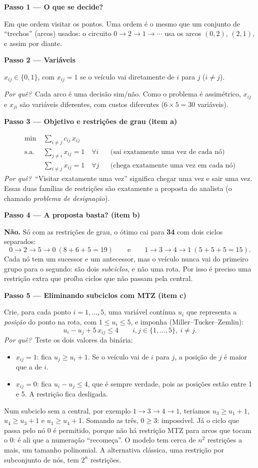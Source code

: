 \documentclass[11pt,a4paper]{article}
\newcommand{\passo}[1]{\par\medskip\textbf{#1}\par}
\newcommand{\porque}{\textit{Por quê?}\ }
\begin{document}
\passo{Passo 1 --- O que se decide?}
Em que ordem visitar os pontos. Uma ordem é o mesmo que um conjunto de ``trechos'' (arcos) usados: o
circuito $0\to2\to1\to\cdots$ usa os arcos $(0,2)$, $(2,1)$, e assim por diante.

\passo{Passo 2 --- Variáveis}
$x_{ij}\in\{0,1\}$, com $x_{ij}=1$ se o veículo vai diretamente de $i$ para $j$ ($i\ne j$).

\porque Cada arco é uma decisão sim/não. Como o problema é assimétrico, $x_{ij}$ e $x_{ji}$ são variáveis
diferentes, com custos diferentes ($6\times5=30$ variáveis).

\passo{Passo 3 --- Objetivo e restrições de grau (item a)}
\begin{align*}
  \min\ & \sum_{i\ne j} c_{ij}\,x_{ij}\\
  \text{s.a.}\ & \sum_{j\ne i} x_{ij} = 1 \quad \forall i && \text{(sai exatamente uma vez de cada nó)}\\
  & \sum_{i\ne j} x_{ij} = 1 \quad \forall j && \text{(chega exatamente uma vez em cada nó)}
\end{align*}
\porque ``Visitar exatamente uma vez'' significa chegar uma vez e sair uma vez. Essas duas famílias de
restrições são exatamente a proposta do analista (o chamado \emph{problema de designação}).

\passo{Passo 4 --- A proposta basta? (item b)}
\textbf{Não.} Só com as restrições de grau, o ótimo cai para \textbf{34} com dois ciclos separados:
\[
  0\to2\to5\to0 \ (8+6+5=19) \qquad\text{e}\qquad 1\to3\to4\to1 \ (5+5+5=15).
\]
Cada nó tem um sucessor e um antecessor, mas o veículo nunca vai do primeiro grupo para o segundo: são dois
\emph{subciclos}, e não uma rota. Por isso é preciso uma restrição extra que proíba ciclos que não passam pela central.

\passo{Passo 5 --- Eliminando subciclos com MTZ (item c)}
Crie, para cada ponto $i=1,\dots,5$, uma variável contínua $u_i$ que representa a \emph{posição} do ponto na
rota, com $1\le u_i\le5$, e imponha (Miller--Tucker--Zemlin):
\[
  u_i - u_j + 5\,x_{ij} \le 4 \qquad i,j\in\{1,\dots,5\},\ i\ne j .
\]
\porque Teste os dois valores da binária:
\begin{itemize}
  \item $x_{ij}=1$: fica $u_j \ge u_i + 1$. Se o veículo vai de $i$ para $j$, a posição de $j$ é maior que a de $i$.
  \item $x_{ij}=0$: fica $u_i-u_j\le4$, que é sempre verdade, pois as posições estão entre 1 e 5. A restrição
        fica desligada.
\end{itemize}
Num subciclo sem a central, por exemplo $1\to3\to4\to1$, teríamos $u_3\ge u_1+1$, $u_4\ge u_3+1$ e
$u_1\ge u_4+1$. Somando as três, $0\ge3$: impossível. Já o ciclo que passa pelo nó 0 é permitido,
porque não há restrição MTZ para arcos que tocam o 0: é ali que a numeração ``recomeça''. O modelo tem
cerca de $n^2$ restrições a mais, um tamanho polinomial. A alternativa clássica, uma restrição por
subconjunto de nós, tem $2^n$ restrições.
\end{document}
